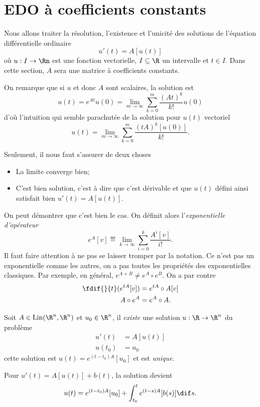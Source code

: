 

\DeclareMathOperator{\lin}{Lin}
\DeclareMathOperator{\spec}{spec}
\DeclareMathOperator{\newnull}{null}
\newcommand{\sol}{\mathcal{S}}

{}{}

\section{EDO à coefficients constants}
Nous allons traiter la résolution, l'existence et l'unicité des solutions
de l'équation différentielle ordinaire
\[ u'(t) = A[u(t)] \]
où $u:I\to\Rn$ est une fonction vectorielle,
$I \subseteq \R $ un intervalle et $t \in I$.
Dans cette section, $A$ sera une matrice à coefficients constants.

On remarque que si $u$ et donc $A$ sont scalaires, la solution est
\[ u(t) = e^{At}u(0) = \lim_{m\to\infty} \sum_{k=0}^m\frac{(At)^k}{k!}u(0) \]
d'où l'intuition qui semble parachutée de la solution pour $u(t)$ vectoriel
\[ u(t) = \lim_{m\to\infty} \sum_{k=0}^m\frac{(tA)^k[u(0)]}{k!}. \]

Seulement, il nous faut s'assurer de deux choses
\begin{itemize}
  \item La limite converge bien;
  \item C'est bien solution,
    c'est à dire que c'est dérivable et que $u(t)$ défini
    ainsi satisfait bien $u'(t) = A[u(t)]$.
\end{itemize}

On peut démontrer que c'est bien le cas.
On définit alors l'\emph{exponentielle d'opérateur}
\[ e^{A}[v] \eqdef \lim_{k\to\infty} \sum_{i=0}^k \frac{A^i[v]}{i!}. \]
Il faut faire attention à ne pas se laisser tromper par la notation.
Ce n'est pas un exponentielle comme les autres, on a pas toutes les propriétés
des exponentielles classiques.
Par exemple, en général, $e^{A + B} \neq e^A \circ e^{B}$.
On a par contre
\begin{align*}
  \fdif{}{t}(e^{tA}[v]) & = e^{tA} \circ A[v]\\
  A \circ e^A & = e^A \circ A.
\end{align*}

\begin{myprop}
  Soit $A \in \lin(\R^n, \R^n)$ et $u_0 \in \R^n$,
  il \emph{existe} une solution
  $u:\R\to\R^n$ du problème
  \begin{align*}
    u'(t) & = A[u(t)]\\
    u(t_0) & = u_0
  \end{align*}
  cette solution est $u(t) = e^{(t-t_0)A}[u_0]$ et est \emph{unique}.
\end{myprop}
Pour $u'(t) = A[u(t)] + b(t)$, la solution devient
\[ u(t) = e^{(t-t_0)A}[u_0] + \int_{t_0}^t e^{(t-s)A}[b(s)]\dif s. \]


